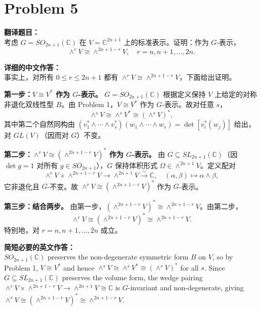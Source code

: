 \documentclass{ctexart}
\begin{document}
\vspace{2em}
\section*{Problem 5}
\textbf{翻译题目：}\\
考虑 $G = SO_{2n+1}(\mathbb{C})$ 在 $V = \mathbb{C}^{2n+1}$ 上的标准表示。证明：作为 $G$-表示，
\[
\wedge^{r} V \cong \wedge^{2n+1-r} V, \quad r = n, n+1, \dots, 2n.
\]

\vspace{1em}
\textbf{详细的中文作答：}\\
事实上，对所有 $0 \leq r \leq 2n+1$ 都有 $\wedge^{r} V \cong \wedge^{2n+1-r} V$，下面给出证明。

\textbf{第一步：$V \cong V^{*}$ 作为 $G$-表示。} $G = SO_{2n+1}(\mathbb{C})$ 根据定义保持 $V$ 上给定的对称非退化双线性型 $B$。由 Problem 1，$V \cong V^{*}$ 作为 $G$-表示。故对任意 $s$，
\[
\wedge^{s} V \cong \wedge^{s} V^{*} \cong (\wedge^{s} V)^{*},
\]
其中第二个自然同构由 $(v_1^* \wedge \cdots \wedge v_s^*)(w_1 \wedge \cdots \wedge w_s) = \det[v_i^{*}(w_j)]$ 给出，对 $GL(V)$（因而对 $G$）不变。

\textbf{第二步：$\wedge^{r} V \cong (\wedge^{2n+1-r} V)^{*}$ 作为 $G$-表示。} 由 $G \subseteq SL_{2n+1}(\mathbb{C})$（因 $\det g = 1$ 对所有 $g \in SO_{2n+1}$），$G$ 保持体积形式 $\Omega \in \wedge^{2n+1} V$。定义配对
\[
\wedge^{r} V \times \wedge^{2n+1-r} V \longrightarrow \wedge^{2n+1} V \xrightarrow{\sim} \mathbb{C}, \quad (\alpha, \beta) \mapsto \alpha \wedge \beta,
\]
它非退化且 $G$-不变。故 $\wedge^{r} V \cong (\wedge^{2n+1-r} V)^{*}$ 作为 $G$-表示。

\textbf{第三步：结合两步。} 由第一步，$(\wedge^{2n+1-r} V)^{*} \cong \wedge^{2n+1-r} V$。由第二步，
\[
\wedge^{r} V \cong (\wedge^{2n+1-r} V)^{*} \cong \wedge^{2n+1-r} V.
\]
特别地，对 $r = n, n+1, \dots, 2n$ 成立。

\vspace{1em}
\textbf{简短必要的英文作答：}\\
$SO_{2n+1}(\mathbb{C})$ preserves the non-degenerate symmetric form $B$ on $V$, so by Problem 1, $V \cong V^{*}$ and hence $\wedge^{s} V \cong \wedge^{s} V^{*} \cong (\wedge^{s} V)^{*}$ for all $s$. Since $G\subseteq SL_{2n+1}(\mathbb{C})$ preserves the volume form, the wedge pairing $\wedge^{r} V \times \wedge^{2n+1-r} V \to \wedge^{2n+1} V \cong \mathbb{C}$ is $G$-invariant and non-degenerate, giving $\wedge^{r} V \cong (\wedge^{2n+1-r} V)^{*} \cong \wedge^{2n+1-r} V$.
\end{document}
